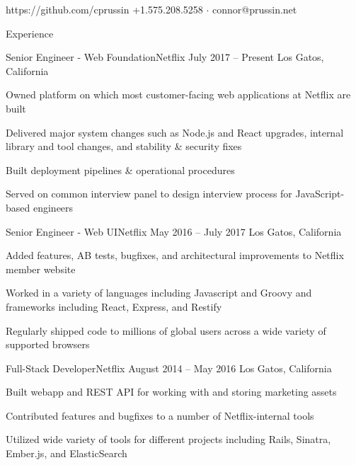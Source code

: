 \documentclass{resume}
\begin{document}
	           {https://github.com/cprussin}
	           {+1.575.208.5258 $\cdot$ connor@prussin.net}

	\begin{section}{Experience}
		\begin{experience}{Senior Engineer - Web Foundation}{Netflix}
		                  {July 2017 – Present}
		                  {Los Gatos, California}
			\item Owned platform on which most customer-facing web
                          applications at Netflix are built
                        \item Delivered major system changes such as Node.js and
                          React upgrades, internal library and tool changes, and
                          stability \& security fixes
                        \item Built deployment pipelines \& operational procedures
                        \item Served on common interview panel to design
                          interview process for JavaScript-based engineers
		\end{experience}

		\begin{experience}{Senior Engineer - Web UI}{Netflix}
		                  {May 2016 – July 2017}
		                  {Los Gatos, California}
			\item Added features, AB tests, bugfixes, and
                          architectural improvements to Netflix member website
			\item Worked in a variety of languages including
                          Javascript and Groovy and frameworks including React,
                          Express, and Restify
			\item Regularly shipped code to millions of global users
                          across a wide variety of supported browsers
		\end{experience}

		\begin{experience}{Full-Stack Developer}{Netflix}
		                  {August 2014 – May 2016}
		                  {Los Gatos, California}
			\item Built webapp and REST API for working with and
                          storing marketing assets
			\item Contributed features and bugfixes to a number of
                          Netflix-internal tools
			\item Utilized wide variety of tools for different
                          projects including Rails, Sinatra, Ember.js, and
                          ElasticSearch
		\end{experience}


\end{section}
\end{document}
